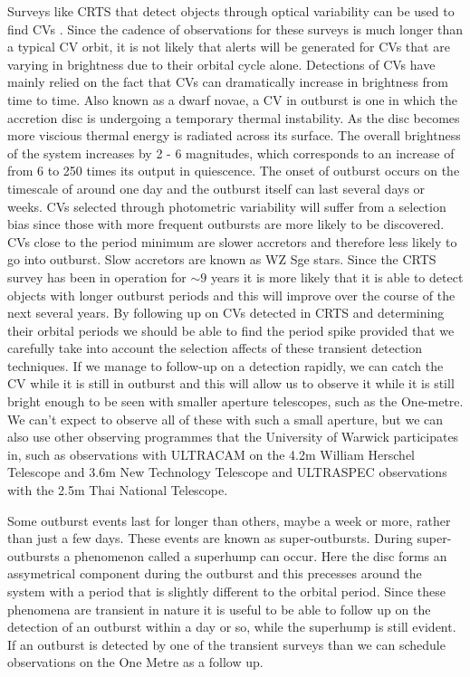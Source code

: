 \documentclass[a4paper,fleqn,usenatbib]{mnras}
\begin{document}
Surveys like CRTS that detect objects through optical variability can be used to find CVs \citep{Breedt2014}. Since the cadence of observations for these surveys is much longer than a typical CV orbit, it is not likely that alerts will be generated for CVs that are varying in brightness due to their orbital cycle alone. Detections of CVs have mainly relied on the fact that CVs can dramatically increase in brightness from time to time. Also known as a dwarf novae, a CV in outburst is one in which the accretion disc is undergoing a temporary thermal instability. As the disc becomes more viscious thermal energy is radiated across its surface. The overall brightness of the system increases by 2 - 6 magnitudes, which corresponds to an increase of from 6 to 250 times its output in quiescence.  The onset of outburst occurs on the timescale of around one day and the outburst itself can last several days or weeks. CVs selected through photometric variability will suffer from a selection bias since those with more frequent outbursts are more likely to be discovered. CVs close to the period minimum are slower accretors and therefore less likely to go into outburst. Slow accretors are known as WZ Sge stars. Since the CRTS survey has been in operation for $\sim 9$ years it is more likely that it is able to detect objects with longer outburst periods and this will improve over the course of the next several years. By following up on CVs detected in CRTS and determining their orbital periods we should be able to find the period spike provided that we carefully take into account the selection affects of these transient detection techniques. If we manage to follow-up on a detection rapidly, we can catch the CV while it is still in outburst and this will allow us to observe it while it is still bright enough to be seen with smaller aperture telescopes, such as the One-metre. We can't expect to observe all of these with such a small aperture, but we can also use other observing programmes that the University of Warwick participates in, such as observations with ULTRACAM on the 4.2m William Herschel Telescope and 3.6m New Technology Telescope and ULTRASPEC observations with the 2.5m Thai National Telescope. 

Some outburst events last for longer than others, maybe a week or more, rather than just a few days. These events are known as super-outbursts. During super-outbursts a phenomenon called a superhump can occur. Here the disc forms an assymetrical component during the outburst and this precesses around the system with a period that is slightly different to the orbital period. Since these phenomena are transient in nature it is useful to be able to follow up on the detection of an outburst within a day or so, while the superhump is still evident. If an outburst is detected by one of the transient surveys than we can schedule observations on the One Metre as a follow up. 
\end{document}
